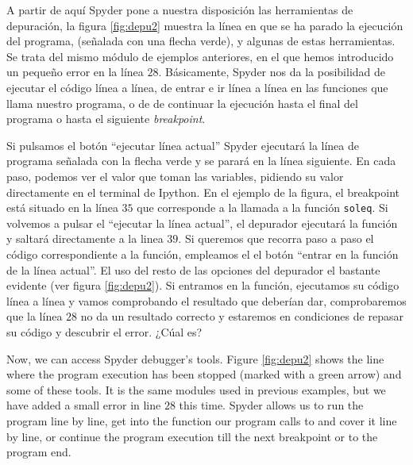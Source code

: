 \begin{paracol}{2}
A partir de aquí Spyder pone a nuestra disposición las herramientas de depuración, la figura \ref{fig:depu2} muestra la línea en que se ha parado la ejecución del programa, (señalada con una flecha verde), y algunas de estas herramientas. Se trata del mismo módulo de ejemplos anteriores, en el que hemos introducido un pequeño error en la línea $28$.  Básicamente, Spyder nos da la posibilidad de ejecutar el código línea a línea, de entrar e ir línea a línea en las funciones que llama nuestro programa, o de de continuar la ejecución hasta el final del programa o hasta el siguiente \emph{breakpoint}.

Si pulsamos el botón ``ejecutar línea actual'' Spyder ejecutará la línea de programa señalada con la flecha verde y se parará en la línea siguiente. En cada paso, podemos ver el valor que toman las variables, pidiendo su valor directamente en el terminal de Ipython. En el ejemplo de la figura, el breakpoint está situado en la línea $35$ que corresponde a la llamada a la función \texttt{soleq}. Si volvemos a pulsar el ``ejecutar la línea actual'', el depurador ejecutará la función y saltará directamente a la linea $39$. Si queremos que recorra paso a paso el código correspondiente a la función, empleamos el el botón ``entrar en la función de la línea actual''. El uso del resto de las opciones del depurador el bastante evidente (ver figura \ref{fig:depu2}). Si entramos en la función, ejecutamos su código línea a línea y vamos comprobando el resultado que deberían dar, comprobaremos que la línea $28$ no da un resultado correcto y estaremos en condiciones de repasar su código y descubrir el error. ¿Cúal es?

\switchcolumn
Now, we can access Spyder debugger's tools. Figure \ref{fig:depu2} shows the line where the program execution has been stopped (marked with a green arrow) and some of these tools. It is the same modules used in previous examples, but we have added a small error in line $28$ this time. Spyder allows us to run the program line by line, get into the function our program calls to and cover it line by line, or continue the program execution till the next breakpoint or to the program end. 


\end{paracol}
